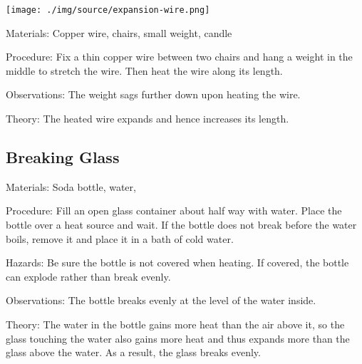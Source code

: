 \begin{multicols}{2}
\begin{center}
\texttt{[image: ./img/source/expansion-wire.png]}
\end{center}

\begin{description*}
\item[Materials:]{Copper wire, chairs, small weight, candle}
\item[Procedure:]{Fix a thin copper wire between two chairs and hang a weight in the middle to stretch the wire. Then heat the wire along its length.}
\item[Observations:]{The weight sags further down upon heating the wire.}
\item[Theory:]{The heated wire expands and hence increases its length.}
\end{description*}

\columnbreak

\subsection{Breaking Glass}


\begin{description*}
\item[Materials:]{Soda bottle, water, }
\item[Procedure:]{Fill an open glass container about half way with water. Place the bottle over a heat source and wait. If the bottle does not break before the water boils, remove it and place it in a bath of cold water.}
\item[Hazards:]{Be sure the bottle is not covered when heating. If covered, the bottle can explode rather than break evenly.}
\item[Observations:]{The bottle breaks evenly at the level of the water inside.}
\item[Theory:]{The water in the bottle gains more heat than the air above it, so the glass touching the water also gains more heat and thus expands more than the glass above the water. As a result, the glass breaks evenly.}
\end{description*}


\end{multicols}
